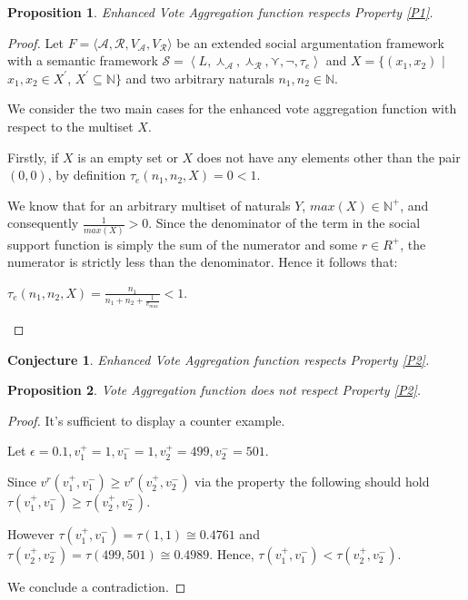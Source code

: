 \documentclass{article}
\newtheorem{proposition}{Proposition}
\newtheorem{conjecture}{Conjecture}
\newcommand{\nat}{\mathbb{N}}   %
\newcommand{\args}{\mathcal{A}} %
\newcommand{\att}{\mathcal{R}}  %
\newcommand{\valueset}{L}
\newcommand{\varg}{V_{\args}}   %
\newcommand{\vatt}{V_{\att}}   %
\newcommand{\safid}{F}               %
\newcommand{\saf}{\safid = \safbody} %
\newcommand{\safbody}{\langle \args, \att, \varg, \vatt \rangle} %
\newcommand{\sembodyNewB}{\left\langle \valueset,\SAFand_\mathcal{A}, \SAFand_\mathcal{R},\SAFor,\lnot,\tau_{e} \right\rangle} %
\newcommand{\SAFand}{\curlywedge}     %
\newcommand{\SAFor}{\curlyvee}        %
\newcommand{\sem}{\mathcal{S}}
\begin{document}
\begin{proposition}
Enhanced Vote Aggregation function respects Property \ref{P1}.
\end{proposition}

\begin{proof} %
Let $\saf$ be an extended social argumentation framework with a semantic framework $\sem = \sembodyNewB$ and $X = \{(x_{1}, x_{2})$ $|$ $x_{1}, x_{2} \in X^{'}$, $X^{'} \subseteq \nat \}$ and two arbitrary naturals $n_1, n_2 \in \nat$.

We consider the two main cases for the enhanced vote aggregation function with respect to the multiset $X$.

Firstly, if $X$ is an empty set or $X$ does not have any elements other than the pair $(0, 0)$, by definition $\tau_{e}(n_1, n_2, X) = 0 < 1$.

We know that for an arbitrary multiset of naturals $Y$, $max(X)  \in \nat^+$, and consequently $\frac{1}{max(X)} > 0$. Since the denominator of the term in the social support function is simply the sum of the numerator and some $r \in {R}^+ $, the numerator is strictly less than the denominator. Hence it follows that: \\
\begin{center}
$ \tau_{e}(n_{1}, n_{2},  X) = \frac{n_{1}}{n_{1} + n_{2}+\frac{1}{v_{max}}} < 1$.
\end{center}
\end{proof}

\begin{conjecture}
Enhanced Vote Aggregation function respects Property \ref{P2}.
\end{conjecture}

\begin{proposition}
Vote Aggregation function\cite{eml2013esaf} does not respect Property \ref{P2}.
\end{proposition}

\begin{proof}
It's sufficient to display a counter example.

Let $\epsilon = 0.1, v_1^{+} = 1, v_1^{-} = 1, v_2^{+} = 499, v_2^{-} = 501$.

Since $v^{r}(v_1^{+}, v_1^{-}) \ge v^{r}(v_2^{+}, v_2^{-})$ via the property the following should hold $\tau(v_1^{+}, v_1^{-}) \ge \tau(v_2^{+}, v_2^{-})$.

However $\tau(v_1^{+}, v_1^{-}) = \tau(1, 1) \cong 0.4761$ and  $\tau(v_2^{+}, v_2^{-}) = \tau(499, 501) \cong 0.4989$.
Hence, $\tau(v_1^{+}, v_1^{-}) < \tau(v_2^{+}, v_2^{-})$.

We conclude a contradiction.
\end{proof}
\end{document}
